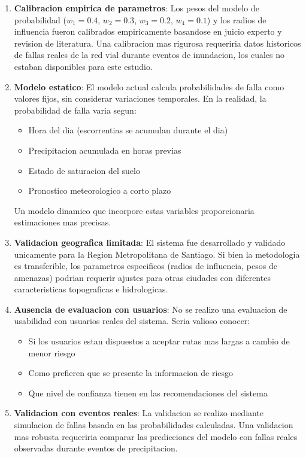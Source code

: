 \documentclass[conference]{IEEEtran}
\begin{document}
\begin{enumerate}
    \item \textbf{Calibracion empirica de parametros}: Los pesos del modelo de probabilidad ($w_1=0.4$, $w_2=0.3$, $w_3=0.2$, $w_4=0.1$) y los radios de influencia fueron calibrados empiricamente basandose en juicio experto y revision de literatura. Una calibracion mas rigurosa requeriria datos historicos de fallas reales de la red vial durante eventos de inundacion, los cuales no estaban disponibles para este estudio.

    \item \textbf{Modelo estatico}: El modelo actual calcula probabilidades de falla como valores fijos, sin considerar variaciones temporales. En la realidad, la probabilidad de falla varia segun:
    \begin{itemize}
        \item Hora del dia (escorrentias se acumulan durante el dia)
        \item Precipitacion acumulada en horas previas
        \item Estado de saturacion del suelo
        \item Pronostico meteorologico a corto plazo
    \end{itemize}
    Un modelo dinamico que incorpore estas variables proporcionaria estimaciones mas precisas.

    \item \textbf{Validacion geografica limitada}: El sistema fue desarrollado y validado unicamente para la Region Metropolitana de Santiago. Si bien la metodologia es transferible, los parametros especificos (radios de influencia, pesos de amenazas) podrian requerir ajustes para otras ciudades con diferentes caracteristicas topograficas e hidrologicas.

    \item \textbf{Ausencia de evaluacion con usuarios}: No se realizo una evaluacion de usabilidad con usuarios reales del sistema. Seria valioso conocer:
    \begin{itemize}
        \item Si los usuarios estan dispuestos a aceptar rutas mas largas a cambio de menor riesgo
        \item Como prefieren que se presente la informacion de riesgo
        \item Que nivel de confianza tienen en las recomendaciones del sistema
    \end{itemize}

    \item \textbf{Validacion con eventos reales}: La validacion se realizo mediante simulacion de fallas basada en las probabilidades calculadas. Una validacion mas robusta requeriria comparar las predicciones del modelo con fallas reales observadas durante eventos de precipitacion.


\end{enumerate}
\end{document}
